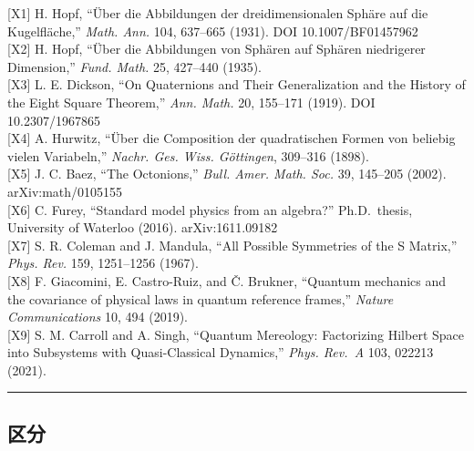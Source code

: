 \documentclass[
  a4paper,
]{ltjsarticle}
\begin{document}
{[}X1{]} H. Hopf, ``Über die Abbildungen der dreidimensionalen Sphäre
auf die Kugelfläche,'' \emph{Math. Ann.} 104, 637--665 (1931). DOI
10.1007/BF01457962\\
{[}X2{]} H. Hopf, ``Über die Abbildungen von Sphären auf Sphären
niedrigerer Dimension,'' \emph{Fund. Math.} 25, 427--440 (1935).\\
{[}X3{]} L. E. Dickson, ``On Quaternions and Their Generalization and
the History of the Eight Square Theorem,'' \emph{Ann. Math.} 20,
155--171 (1919). DOI 10.2307/1967865\\
{[}X4{]} A. Hurwitz, ``Über die Composition der quadratischen Formen von
beliebig vielen Variabeln,'' \emph{Nachr. Ges. Wiss. Göttingen},
309--316 (1898).\\
{[}X5{]} J. C. Baez, ``The Octonions,'' \emph{Bull. Amer. Math. Soc.}
39, 145--205 (2002). arXiv:math/0105155\\
{[}X6{]} C. Furey, ``Standard model physics from an algebra?''
Ph.D.~thesis, University of Waterloo (2016). arXiv:1611.09182\\
{[}X7{]} S. R. Coleman and J. Mandula, ``All Possible Symmetries of the
S Matrix,'' \emph{Phys. Rev.} 159, 1251--1256 (1967).\\
{[}X8{]} F. Giacomini, E. Castro-Ruiz, and Č. Brukner, ``Quantum
mechanics and the covariance of physical laws in quantum reference
frames,'' \emph{Nature Communications} 10, 494 (2019).\\
{[}X9{]} S. M. Carroll and A. Singh, ``Quantum Mereology: Factorizing
Hilbert Space into Subsystems with Quasi-Classical Dynamics,''
\emph{Phys. Rev.~A} 103, 022213 (2021).

\begin{center}\rule{0.5\linewidth}{0.5pt}\end{center}

\subsection{区分}\label{ux533aux5206}
\end{document}
